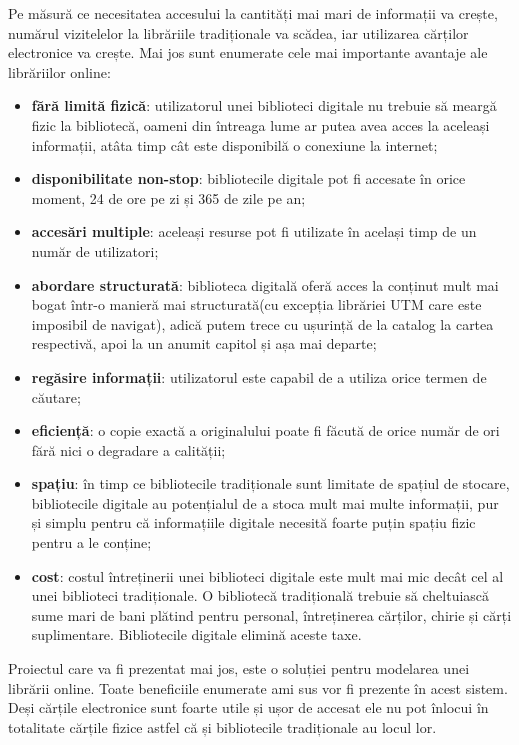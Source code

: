 Pe măsură ce necesitatea accesului la cantități mai mari de informații va
crește, numărul vizitelelor la librăriile tradiționale va scădea, iar
utilizarea cărților electronice va crește. Mai jos sunt enumerate cele mai importante avantaje ale librăriilor online\cite{Benefits}:
\begin{itemize}
\item \textbf{fără limită fizică}: utilizatorul unei biblioteci digitale nu trebuie să meargă fizic la bibliotecă, oameni din întreaga lume ar putea avea acces la aceleași informații, atâta timp cât este disponibilă o conexiune la internet;
\item \textbf{disponibilitate non-stop}: bibliotecile digitale pot fi accesate în orice moment, 24 de ore pe zi și 365 de zile pe an;
\item \textbf{accesări multiple}: aceleași resurse pot fi utilizate în același timp de un număr de utilizatori;
\item \textbf{abordare structurată}: biblioteca digitală oferă acces la conținut mult mai bogat într-o manieră mai structurată(cu excepția librăriei UTM care este imposibil de navigat), adică putem trece cu ușurință de la catalog la cartea respectivă, apoi la un anumit capitol și așa mai departe;
\item \textbf{regăsire informații}: utilizatorul este capabil de a utiliza orice termen de căutare;
\item \textbf{eficiență}: o copie exactă a originalului poate fi făcută de orice număr de ori fără nici o degradare a calității;
\item \textbf{spațiu}: în timp ce bibliotecile tradiționale sunt limitate de spațiul de stocare, bibliotecile digitale au potențialul de a stoca mult mai multe informații, pur și simplu pentru că informațiile digitale necesită foarte puțin spațiu fizic pentru a le conține;
\item \textbf{cost}: costul întreținerii unei biblioteci digitale este mult mai mic decât cel al unei biblioteci tradiționale. O bibliotecă tradițională trebuie să cheltuiască sume mari de bani plătind pentru personal, întreținerea cărților, chirie și cărți suplimentare. Bibliotecile digitale elimină aceste taxe.
\end{itemize}

Proiectul care va fi prezentat mai jos, este o soluției pentru modelarea unei
librării online. Toate beneficiile enumerate ami sus vor fi prezente în acest
sistem. Deși cărțile electronice sunt foarte utile și ușor de accesat ele nu
pot înlocui în totalitate cărțile fizice astfel că și bibliotecile tradiționale
au locul lor.
